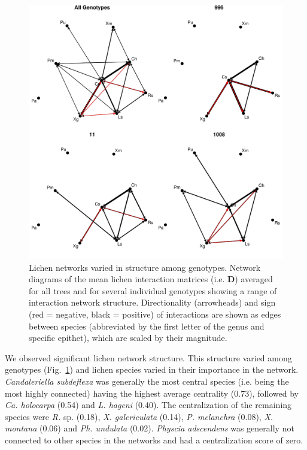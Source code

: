 \documentclass[9pt,twocolumn,twoside,lineno]{pnas-new}
\begin{document}
{\begin{figure}[ht]
\centering
\includegraphics[width=\linewidth]{cn_onc.pdf}
\caption{Lichen networks varied in structure among genotypes. Network
  diagrams of the mean lichen interaction matrices (i.e. $\mathbf{D}$)
  averaged for all trees and for several individual genotypes showing
  a range of interaction network structure. Directionality
  (arrowheads) and sign (red = negative, black = positive) of
  interactions are shown as edges between species (abbreviated by the
  first letter of the genus and specific epithet), which are scaled by
  their magnitude.}
\label{fig:geno_nets}
\end{figure}


We observed significant lichen network structure. This structure
varied among genotypes (Fig.~\ref{fig:geno_nets}) and lichen species
varied in their importance in the network. \textit{Candaleriella
  subdeflexa} was generally the most central species (i.e. being the
most highly connected) having the highest average centrality (0.73),
followed by \textit{Ca. holocarpa} (0.54) and \textit{L. hageni}
(0.40). The centralization of the remaining species were \textit{R.}
sp. (0.18), \textit{X. galericulata} (0.14), \textit{P. melanchra}
(0.08), \textit{X. montana} (0.06) and \textit{Ph. undulata}
(0.02). \textit{Physcia adscendens} was generally not connected to
other species in the networks and had a centralization score of zero.

}
\end{document}
